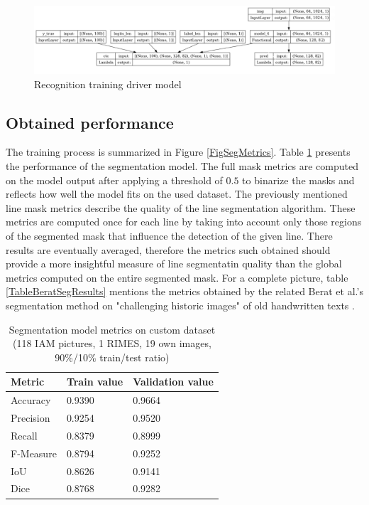 \begin{figure}[htbp]
    \centering
        \includegraphics[scale=0.4]{figures/rec_train_model.png}
    \caption{Recognition training driver model}    
    \label{FigRecTrainModel}
\end{figure}

\subsection{Obtained performance}

The training process is summarized in Figure \ref{FigSegMetrics}. Table \ref{TableSegmentationMetrics} presents the performance of the segmentation model. The full mask metrics are computed on the model output after applying a threshold of $0.5$ to binarize the masks
and reflects how well the model fits on the used dataset. The previously mentioned line mask metrics describe the quality of the line segmentation algorithm. These metrics are computed once for each line by taking into account only those regions of the segmented mask that influence the detection of the given line. There results are eventually averaged, therefore the metrics such obtained should provide a more insightful measure of line segmentatin quality than the global metrics computed on the entire segmented mask. For a complete picture, table \ref{TableBeratSegResults} mentions the metrics obtained by the related Berat et al.'s segmentation method on "challenging historic images" of old handwritten texts \cite{segmChallenging}.

\begin{table}[htbp]
\begin{center}
\begin{tabular}
{|p{100pt}|p{50pt}|p{50pt}|}
\hline
 Metric  &  Train value & Validation value\\
\hline 
Accuracy & 0.9390 & 0.9664\\ \hline
Precision & 0.9254 & 0.9520 \\ \hline
Recall & 0.8379 & 0.8999 \\ \hline
F-Measure & 0.8794 & 0.9252 \\ \hline
IoU & 0.8626 & 0.9141 \\ \hline
Dice & 0.8768 & 0.9282 \\ \hline

\end{tabular}
\end{center}
\captionsetup{justification=centering,margin=1cm}
\caption{Segmentation model metrics on custom dataset \\ \small{(118 IAM pictures, 1 RIMES, 19 own images, 90\%/10\% train/test ratio)}}
\label{TableSegmentationMetrics}
\end{table}

